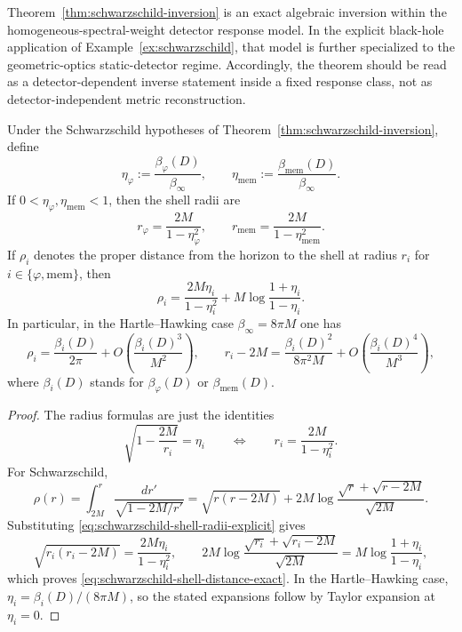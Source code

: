 \begin{remark}\label{rem:schwarzschild-inversion-status}
Theorem~\ref{thm:schwarzschild-inversion} is an exact algebraic inversion within the homogeneous-spectral-weight detector response model. In the explicit black-hole application of Example~\ref{ex:schwarzschild}, that model is further specialized to the geometric-optics static-detector regime. Accordingly, the theorem should be read as a detector-dependent inverse statement inside a fixed response class, not as detector-independent metric reconstruction.
\end{remark}

\begin{corollary}\label{cor:schwarzschild-shell-formulas}
Under the Schwarzschild hypotheses of Theorem~\ref{thm:schwarzschild-inversion}, define
\[
\eta_\varphi:=\frac{\beta_\varphi(D)}{\beta_\infty},
\qquad
\eta_{\mathrm{mem}}:=\frac{\beta_{\mathrm{mem}}(D)}{\beta_\infty}.
\]
If $0<\eta_\varphi,\eta_{\mathrm{mem}}<1$, then the shell radii are
\begin{equation}\label{eq:schwarzschild-shell-radii-explicit}
r_\varphi=\frac{2M}{1-\eta_\varphi^2},
\qquad
r_{\mathrm{mem}}=\frac{2M}{1-\eta_{\mathrm{mem}}^2}.
\end{equation}
If $\rho_i$ denotes the proper distance from the horizon to the shell at radius $r_i$ for $i\in\{\varphi,\mathrm{mem}\}$, then
\begin{equation}\label{eq:schwarzschild-shell-distance-exact}
\rho_i
=
\frac{2M\eta_i}{1-\eta_i^2}
+
M\log\frac{1+\eta_i}{1-\eta_i}.
\end{equation}
In particular, in the Hartle--Hawking case $\beta_\infty=8\pi M$ one has
\begin{equation}\label{eq:schwarzschild-shell-distance-hh}
\rho_i
=
\frac{\beta_i(D)}{2\pi}
+
O\!\left(\frac{\beta_i(D)^3}{M^2}\right),
\qquad
r_i-2M
=
\frac{\beta_i(D)^2}{8\pi^2 M}
+
O\!\left(\frac{\beta_i(D)^4}{M^3}\right),
\end{equation}
where $\beta_i(D)$ stands for $\beta_\varphi(D)$ or $\beta_{\mathrm{mem}}(D)$.
\end{corollary}

\begin{proof}
The radius formulas are just the identities
\[
\sqrt{1-\frac{2M}{r_i}}=\eta_i
\qquad\Longleftrightarrow\qquad
r_i=\frac{2M}{1-\eta_i^2}.
\]
For Schwarzschild,
\[
\rho(r)
=
\int_{2M}^{r}\frac{dr'}{\sqrt{1-2M/r'}}
=
\sqrt{r(r-2M)}
+
2M\log\frac{\sqrt r+\sqrt{r-2M}}{\sqrt{2M}}.
\]
Substituting \eqref{eq:schwarzschild-shell-radii-explicit} gives
\[
\sqrt{r_i(r_i-2M)}=\frac{2M\eta_i}{1-\eta_i^2},
\qquad
2M\log\frac{\sqrt{r_i}+\sqrt{r_i-2M}}{\sqrt{2M}}
=
M\log\frac{1+\eta_i}{1-\eta_i},
\]
which proves \eqref{eq:schwarzschild-shell-distance-exact}. In the Hartle--Hawking case, $\eta_i=\beta_i(D)/(8\pi M)$, so the stated expansions follow by Taylor expansion at $\eta_i=0$.
\end{proof}

